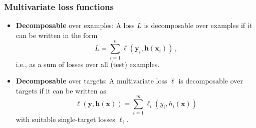\documentclass[]{beamer}
\newcommand{\bx}{\boldsymbol{x}}
\newcommand{\by}{\boldsymbol{y}}
\newcommand{\bh}{\boldsymbol{h}}
\renewcommand{\emph}[1]{\textbf{\color{putblue}#1}}
\begin{document}
\begin{frame}
\frametitle{Multivariate loss functions}

\begin{itemize}
\item \emph{Decomposable} over examples: A loss $L$ is decomposable over examples if it can be written in the form
$$
L = \sum_{i=1}^n \ell(\by_i, \bh(\bx_i)) 
\, ,
$$
i.e., as a sum of losses over all (test) examples. 
\pause

\item \emph{Decomposable} over targets: A multivariate loss $\ell$ is decomposable over targets if it can be written as
$$
\ell(\by, \bh(\bx)) = \sum_{i=1}^m \ell_i(y_i, h_i(\bx)) 
$$
with suitable single-target losses $\ell_i$. 

\end{itemize}

\end{frame}
\end{document}
